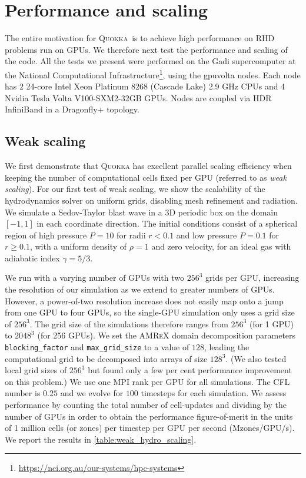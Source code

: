 \documentclass[fleqn,usenatbib]{mnras}
\newcommand{\quokka}{\textsc{Quokka}}
\begin{document}
\section{Performance and scaling}
The entire motivation for \quokka~is to achieve high performance on RHD problems run on GPUs. We therefore next test the performance and scaling of the code. All the tests we present were performed on the Gadi supercomputer at the National Computational Infrastructure\footnote{\url{https://nci.org.au/our-systems/hpc-systems}}, using the gpuvolta nodes. Each node has 2 24-core Intel Xeon Platinum 8268 (Cascade Lake) 2.9 GHz CPUs and 4 Nvidia Tesla Volta V100-SXM2-32GB GPUs. Nodes are coupled via HDR InfiniBand in a Dragonfly+ topology.

\label{section:performance}
\subsection{Weak scaling}
We first demonstrate that \textsc{Quokka} has excellent parallel scaling efficiency when keeping the number of computational cells fixed per GPU (referred to as \emph{weak scaling}). For our first test of weak scaling, we show the scalability of the hydrodynamics solver on uniform grids, disabling mesh refinement and radiation. We simulate a Sedov-Taylor blast wave \citep{Sedov_1959,Taylor_1946} in a 3D periodic box on the domain $[-1, 1]$ in each coordinate direction. The initial conditions consist of a spherical region of high pressure $P = 10$ for radii $r < 0.1$ and low pressure $P = 0.1$ for $r \ge 0.1$, with a uniform density of $\rho = 1$ and zero velocity, for an ideal gas with adiabatic index $\gamma = 5/3$.

We run with a varying number of GPUs with two $256^3$ grids per GPU, increasing the resolution of our simulation as we extend to greater numbers of GPUs. However, a power-of-two resolution increase does not easily map onto a jump from one GPU to four GPUs, so the single-GPU simulation only uses a grid size of $256^3$. The grid size of the simulations therefore ranges from $256^3$ (for 1 GPU) to $2048^3$ (for 256 GPUs). We set the \textsc{AMReX} domain decomposition parameters \texttt{blocking\_factor} and \texttt{max\_grid\_size} to a value of $128$, leading the computational grid to be decomposed into arrays of size $128^3$. (We also tested local grid sizes of $256^3$ but found only a few per cent performance improvement on this problem.) We use one MPI rank per GPU for all simulations. The CFL number is $0.25$ and we evolve for $100$ timesteps for each simulation. We assess performance by counting the total number of cell-updates and dividing by the number of GPUs in order to obtain the performance figure-of-merit in the units of 1 million cells (or zones) per timestep per GPU per second (Mzones/GPU/s).  We report the results in \autoref{table:weak_hydro_scaling}. 
\end{document}
